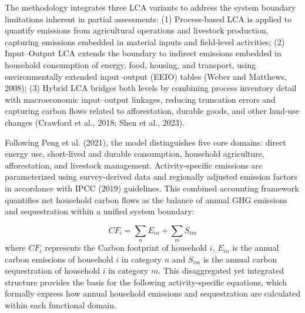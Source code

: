 \documentclass[12pt,a4paper]{article}%
\begin{document}
The methodology integrates three LCA variants to address the system boundary limitations inherent in partial assessments: (1) Process-based LCA is applied to quantify emissions from agricultural operations and livestock production, capturing emissions embedded in material inputs and field-level activities; (2) Input–Output LCA extends the boundary to indirect emissions embedded in household consumption of energy, food, housing, and transport, using environmentally extended input–output (EEIO) tables (Weber and Matthews, 2008); (3) Hybrid LCA bridges both levels by combining process inventory detail with macroeconomic input–output linkages, reducing truncation errors and capturing carbon flows related to afforestation, durable goods, and other land-use changes (Crawford et al., 2018; Shen et al., 2023).

Following Peng et al. (2021), the model distinguishes five core domains: direct energy use, short-lived and durable consumption, household agriculture, afforestation, and livestock management. Activity-specific emissions are parameterized using survey-derived data and regionally adjusted emission factors in accordance with IPCC (2019) guidelines. This combined accounting framework quantifies net household carbon flows as the balance of annual GHG emissions and sequestration within a unified system boundary:

\begin{equation}
CF_i = \sum_{n} E_{in} + \sum_{m} S_{im}
\end{equation}
where $CF_i$ represents the Carbon footprint of household $i$, $E_{in}$ is the annual carbon emissions of household $i$ in category $n$ and $S_{im}$ is the annual carbon sequestration of household $i$ in category $m$. This disaggregated yet integrated structure provides the basis for the following activity-specific equations, which formally express how annual household emissions and sequestration are calculated within each functional domain.
\end{document}
